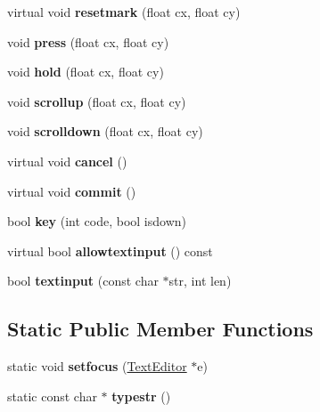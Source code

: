 \begin{DoxyCompactItemize}
virtual void {\bfseries resetmark} (float cx, float cy)
\item 
\mbox{\label{struct_u_i_1_1_text_editor_a3db84fc15498646ad64a537895303acd}} 
void {\bfseries press} (float cx, float cy)
\item 
\mbox{\label{struct_u_i_1_1_text_editor_a3845b2b2ea60b7f07d1b95a485e426e5}} 
void {\bfseries hold} (float cx, float cy)
\item 
\mbox{\label{struct_u_i_1_1_text_editor_a283dc3ae9c79351d38f83abdd783950f}} 
void {\bfseries scrollup} (float cx, float cy)
\item 
\mbox{\label{struct_u_i_1_1_text_editor_a370d03d598adbf77a0a399b2002b7587}} 
void {\bfseries scrolldown} (float cx, float cy)
\item 
\mbox{\label{struct_u_i_1_1_text_editor_ad1bd98b516072b8bbb21b9f2f40b35d3}} 
virtual void {\bfseries cancel} ()
\item 
\mbox{\label{struct_u_i_1_1_text_editor_a6b20751cd6fdb90621f3fe2a2f4cf398}} 
virtual void {\bfseries commit} ()
\item 
\mbox{\label{struct_u_i_1_1_text_editor_a994cd269023be636fd170488f5dde53d}} 
bool {\bfseries key} (int code, bool isdown)
\item 
\mbox{\label{struct_u_i_1_1_text_editor_ab6076330b8630428bc19716a5766c0d0}} 
virtual bool {\bfseries allowtextinput} () const
\item 
\mbox{\label{struct_u_i_1_1_text_editor_a7e152712f9e0841420b8728b5bca3c2f}} 
bool {\bfseries textinput} (const char $\ast$str, int len)
\end{DoxyCompactItemize}
\subsection*{Static Public Member Functions}
\begin{DoxyCompactItemize}
\item 
\mbox{\label{struct_u_i_1_1_text_editor_acd1ea8fd1c1756f44e3fa7363bbe7b91}} 
static void {\bfseries setfocus} (\hyperlink{struct_u_i_1_1_text_editor}{Text\+Editor} $\ast$e)
\item 
\mbox{\label{struct_u_i_1_1_text_editor_a579a45d062249565ce07ef47ddd8c02c}} 
static const char $\ast$ {\bfseries typestr} ()
\end{DoxyCompactItemize}
